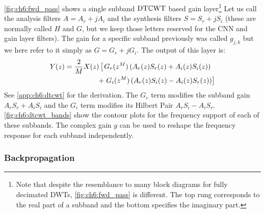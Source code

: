 \autoref{fig:ch6:fwd_pass} shows a single subband $\mathrm{DT}\mathbb{C}\mathrm{WT}$
based gain layer\footnote{Note that despite the resemblance to many block
diagrams for fully decimated DWTs, \autoref{fig:ch6:fwd_pass} is different.
The top rung corresponds to the real part of a subband and the bottom specifies
the imaginary part.}
Let us call the analysis filters $A = A_r + jA_i$ and 
the synthesis filters $S = S_r + jS_i$ (these are normally called $H$ and
$G$, but we keep those letters reserved for the CNN and gain layer filters). The
gain for a specific subband previously was called $g_{j,k}$ but we here refer to
it simply as $G = G_r + jG_i$. The output of this layer is:
\begin{align}\label{eq:ch6:dtcwt_fwd}
  Y(z) = \frac{2}{M}X(z) \left[\vphantom{z^{M}} \right. &  G_r(z^{M}) \left(A_r(z)S_r(z) + A_i(z)S_i(z)\right) \nonumber \\
  +  & \left. G_i(z^{M}) \left( A_r(z)S_i(z) - A_i(z)S_r(z)\right) \right] 
\end{align}
See \autoref{app:ch6:dtcwt} for the derivation. The $G_r$ term modifies the
subband gain $A_rS_r + A_iS_i$ and the $G_i$ term modifies its Hilbert Pair
$A_rS_i - A_iS_r$. \autoref{fig:ch6:dtcwt_bands} show the contour plots for the
frequency support of each of these subbands. The complex gain $g$ can be used to
reshape the frequency response for each subband independently.

\begin{figure}[t]
  \centering
  \hspace{1cm}
  \label{fig:ch6:dtcwt_bands}
\end{figure}

\subsubsection{Backpropagation}\label{sec:ch6:dtcwt_update}

